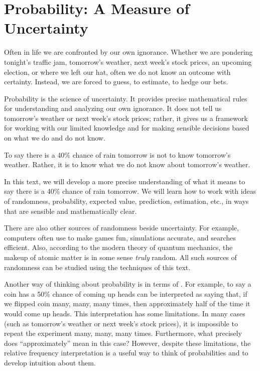 \section{Probability: A Measure of Uncertainty}
Often in life we are confronted by our own ignorance. Whether we are pondering tonight's traffic jam, tomorrow's weather, next week's stock prices, an upcoming election, or where we left our hat, often we do not know an outcome with certainty. Instead, we are forced to guess, to estimate, to hedge our bets.

Probability is the science of uncertainty. It provides precise mathematical rules for understanding and analyzing our own ignorance. It does not tell us tomorrow's weather or next week's stock prices; rather, it gives us a framework for working with our limited knowledge and for making sensible decisions based on what we do and do not know.

To say there is a 40\% chance of rain tomorrow is not to know tomorrow's weather. Rather, it is to know what we do
not know about tomorrow's weather.

In this text, we will develop a more precise understanding of what it means to say there is a 40\% chance of rain
tomorrow. We will learn how to work with ideas of randomness, probability, expected value, prediction, estimation,
etc., in ways that are sensible and mathematically clear.

There are also other sources of randomness beside uncertainty. For example, computers often use  to make games fun, simulations accurate, and searches efficient. Also, according
to the modern theory of quantum mechanics, the makeup of atomic matter is in some sense \emph{truly} random. All such
sources of randomness can be studied using the techniques of this text.

Another way of thinking about probability is in terms of . For
example, to say a coin has a 50\% chance of coming up heads can be interpreted as saying that, if we flipped coin
many, many, many times, then approximately half of the time it would come up heads. This interpretation has some
limitations. In many cases (such as tomorrow's weather or next week's stock prices), it is impossible to repeat the
experiment many, many, many times. Furthermore, what precisely does ``approximately'' mean in this case? However,
despite these limitations, the relative frequency interpretation is a useful way to think of probabilities and to
develop intuition about them.

